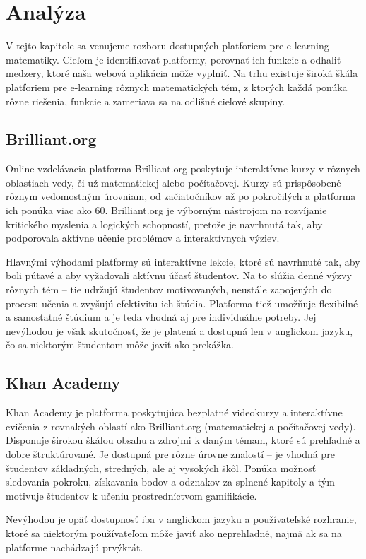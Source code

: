 \section{Analýza}
V tejto kapitole sa venujeme rozboru dostupných platforiem pre e-learning matematiky. 
Cieľom je identifikovať platformy, porovnať ich funkcie a odhaliť medzery, ktoré naša webová aplikácia môže vyplniť. 
Na trhu existuje široká škála platforiem pre e-learning rôznych matematických tém, 
z ktorých každá ponúka rôzne riešenia, funkcie a zameriava sa na odlišné cieľové skupiny.

\subsection{Brilliant.org}
Online vzdelávacia platforma Brilliant.org poskytuje interaktívne kurzy v rôznych oblastiach vedy, či už matematickej alebo počítačovej.
 Kurzy sú prispôsobené rôznym vedomostným úrovniam, od začiatočníkov až po pokročilých a platforma ich ponúka viac ako 60.
 Brilliant.org je výborným nástrojom na rozvíjanie kritického myslenia a logických schopností, pretože je navrhnutá tak, aby podporovala aktívne učenie problémov a interaktívnych výziev.

 Hlavnými výhodami platformy sú interaktívne lekcie, ktoré sú navrhnuté tak, aby boli pútavé a aby vyžadovali aktívnu účasť študentov.
  Na to slúžia denné výzvy rôznych tém – tie udržujú študentov motivovaných, neustále zapojených do procesu učenia a zvyšujú efektivitu ich štúdia.
   Platforma tiež umožňuje flexibilné a  samostatné štúdium a je teda vhodná aj pre individuálne potreby.
  Jej nevýhodou je však skutočnosť, že je platená a dostupná len v anglickom jazyku, čo sa niektorým študentom môže javiť ako prekážka.\cite{brilliant}
\subsection{Khan Academy}
Khan Academy je platforma poskytujúca bezplatné videokurzy a interaktívne cvičenia z rovnakých oblastí ako Brilliant.org (matematickej a počítačovej vedy).
 Disponuje širokou škálou obsahu a zdrojmi k daným témam, ktoré sú prehľadné a dobre štruktúrované. Je dostupná pre rôzne úrovne znalostí – je vhodná pre študentov základných, stredných, ale aj vysokých škôl.
 Ponúka možnosť sledovania pokroku, získavania bodov a odznakov za splnené kapitoly a tým motivuje študentov k učeniu prostredníctvom gamifikácie.

 Nevýhodou je opäť dostupnosť iba v anglickom jazyku a používateľské rozhranie, ktoré sa niektorým používateľom môže javiť ako neprehľadné, najmä ak sa na platforme nachádzajú prvýkrát.\cite{khanacademy}
